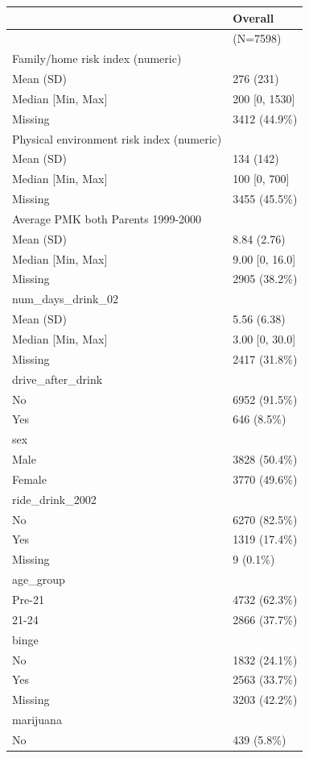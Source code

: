 \documentclass[
]{article}
\begin{document}
\begin{longtable}[]{@{}ll@{}}
\toprule\noalign{}
& Overall \\
\midrule\noalign{}
\endhead
\bottomrule\noalign{}
\endlastfoot
& (N=7598) \\
Family/home risk index (numeric) & \\
Mean (SD) & 276 (231) \\
Median {[}Min, Max{]} & 200 {[}0, 1530{]} \\
Missing & 3412 (44.9\%) \\
Physical environment risk index (numeric) & \\
Mean (SD) & 134 (142) \\
Median {[}Min, Max{]} & 100 {[}0, 700{]} \\
Missing & 3455 (45.5\%) \\
Average PMK both Parents 1999-2000 & \\
Mean (SD) & 8.84 (2.76) \\
Median {[}Min, Max{]} & 9.00 {[}0, 16.0{]} \\
Missing & 2905 (38.2\%) \\
num\_days\_drink\_02 & \\
Mean (SD) & 5.56 (6.38) \\
Median {[}Min, Max{]} & 3.00 {[}0, 30.0{]} \\
Missing & 2417 (31.8\%) \\
drive\_after\_drink & \\
No & 6952 (91.5\%) \\
Yes & 646 (8.5\%) \\
sex & \\
Male & 3828 (50.4\%) \\
Female & 3770 (49.6\%) \\
ride\_drink\_2002 & \\
No & 6270 (82.5\%) \\
Yes & 1319 (17.4\%) \\
Missing & 9 (0.1\%) \\
age\_group & \\
Pre-21 & 4732 (62.3\%) \\
21-24 & 2866 (37.7\%) \\
binge & \\
No & 1832 (24.1\%) \\
Yes & 2563 (33.7\%) \\
Missing & 3203 (42.2\%) \\
marijuana & \\
No & 439 (5.8\%) \\

\end{longtable}
\end{document}
